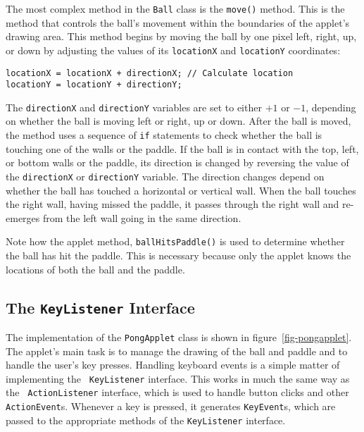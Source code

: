 The most complex method in the {\tt Ball} class is the {\tt move()}
method. This is the method that controls the ball's movement within
the boundaries of the applet's drawing area. This method begins
by moving the ball by one pixel left, right, up, or down by adjusting
the values of its {\tt locationX} and {\tt locationY} coordinates:

\begin{jjjlisting}
\begin{lstlisting}
locationX = locationX + directionX; // Calculate location
locationY = locationY + directionY;
\end{lstlisting}
\end{jjjlisting}

\noindent The {\tt directionX} and {\tt directionY} variables are set
to either $+1$ or $-1$, depending on whether the ball is moving left
or right, up or down. After the ball is moved, the method uses a
sequence of {\tt if} statements to check whether the ball is touching
one of the walls or the paddle.  If the ball is in contact with the
top, left, or bottom walls or the paddle, its direction is changed by
reversing the value of the {\tt directionX} or {\tt directionY}
variable. The direction changes depend on whether the ball has touched
a horizontal or vertical wall. When the ball touches the right wall,
having missed the paddle, it passes through the right wall and
re-emerges from the left wall going in the same direction.

Note how the applet method, {\tt ballHitsPaddle()} is used to
determine whether the ball has hit the paddle. This is necessary
because only the applet knows the locations of both the ball and the
paddle.

\subsection{The {\tt KeyListener} Interface}

The implementation of the {\tt PongApplet} class is shown in
figure~\ref{fig-pongapplet}. The applet's main task is to manage the
drawing of the ball and paddle and to handle the user's key presses.
Handling keyboard events is a simple matter of implementing the {\tt
KeyListener} interface. This works in much the same way as the {\tt
ActionListener} interface, which is used to handle button clicks and
other {\tt ActionEvent}s.  Whenever a key is pressed, it generates
{\tt KeyEvent}s, which are passed to the appropriate methods of the
{\tt KeyListener} interface.

